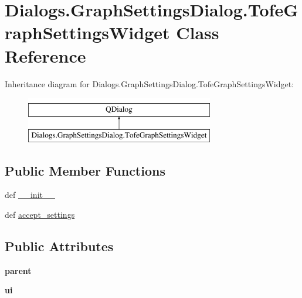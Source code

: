 \hypertarget{classDialogs_1_1GraphSettingsDialog_1_1TofeGraphSettingsWidget}{\section{Dialogs.\-Graph\-Settings\-Dialog.\-Tofe\-Graph\-Settings\-Widget Class Reference}
\label{classDialogs_1_1GraphSettingsDialog_1_1TofeGraphSettingsWidget}
}
Inheritance diagram for Dialogs.\-Graph\-Settings\-Dialog.\-Tofe\-Graph\-Settings\-Widget\-:\begin{figure}[H]
\begin{center}
\leavevmode
\includegraphics[height=2.000000cm]{classDialogs_1_1GraphSettingsDialog_1_1TofeGraphSettingsWidget}
\end{center}
\end{figure}
\subsection*{Public Member Functions}
\begin{DoxyCompactItemize}
\item 
def \hyperlink{classDialogs_1_1GraphSettingsDialog_1_1TofeGraphSettingsWidget_a3bf85acfd88552df3e5c0bcc781da6a1}{\-\_\-\-\_\-init\-\_\-\-\_\-}
\item 
def \hyperlink{classDialogs_1_1GraphSettingsDialog_1_1TofeGraphSettingsWidget_a20bf2ad6e8c2311fabc2f6a7c1de4fec}{accept\-\_\-settings}
\end{DoxyCompactItemize}
\subsection*{Public Attributes}
\begin{DoxyCompactItemize}
\item 
\hypertarget{classDialogs_1_1GraphSettingsDialog_1_1TofeGraphSettingsWidget_a32db939ed1252aec5501d126fcca466c}{{\bfseries parent}}\label{classDialogs_1_1GraphSettingsDialog_1_1TofeGraphSettingsWidget_a32db939ed1252aec5501d126fcca466c}

\item 
\hypertarget{classDialogs_1_1GraphSettingsDialog_1_1TofeGraphSettingsWidget_af2fd93cb001971f26588e38b0a1afaab}{{\bfseries ui}}\label{classDialogs_1_1GraphSettingsDialog_1_1TofeGraphSettingsWidget_af2fd93cb001971f26588e38b0a1afaab}

\end{DoxyCompactItemize}


